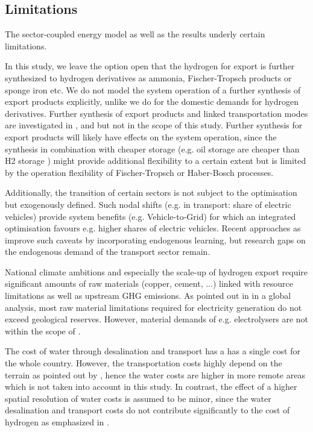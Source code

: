 \subsection{Limitations}
\label{subsec:limitations}

The sector-coupled energy model as well as the results underly certain limitations. 

In this study, we leave the option open that the hydrogen for export is further synthesized to hydrogen derivatives as ammonia, Fischer-Tropsch products or sponge iron etc. We do not model the system operation of a further synthesis of export products explicitly, unlike we do for the domestic demands for hydrogen derivatives. Further synthesis of export products and linked transportation modes are investigated in \cite{Hampp2021}, \cite{Galimova2023} and \cite{Verpoort2023} but not in the scope of this study. Further synthesis for export products will likely have effects on the system operation, since the synthesis in combination with cheaper storage (e.g. oil storage are cheaper than H2 storage \cite{DEA2019TechnologyData}) might provide additional flexibility to a certain extent but is limited by the operation flexibility of Fischer-Tropsch or Haber-Bosch processes.

Additionally, the transition of certain sectors is not subject to the optimisation but exogenously defined. Such nodal shifts (e.g. in transport: share of electric vehicles) provide system benefits (e.g. Vehicle-to-Grid) for which an integrated optimisation favours e.g. higher shares of electric vehicles.
Recent approaches as \cite{Zeyen2023} improve such caveats by incorporating endogenous learning, but research gaps on the endogenous demand of the transport sector remain.

National climate ambitions and especially the scale-up of hydrogen export require significant amounts of raw materials (copper, cement, ...) linked with resource limitations as well as upstream GHG emissions. As pointed out in \cite{Wang2023} in a global analysis, most raw material limitations required for electricity generation do not exceed geological reserves. However, material demands of e.g. electrolysers are not within the scope of \cite{Wang2023}.

The cost of water through desalination and transport has a 
has a single cost for the whole country. However, the transportation costs highly depend on the terrain as pointed out by \cite{Caldera2016}, hence the water costs are higher in more remote areas which is not taken into account in this study. In contrast, the effect of a higher spatial resolution of water costs is assumed to be minor, since the water desalination and transport costs do not contribute significantly to the cost of hydrogen as emphasized in \cite{Hampp2023}. %

